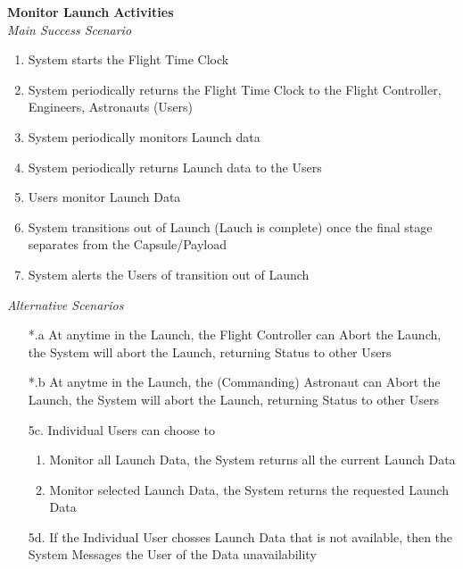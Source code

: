 \documentclass[letterpaper]{article}
\begin{document}
\noindent
\textbf{Monitor Launch Activities}\\
\textit{Main Success Scenario}
\begin{enumerate}
\item System starts the Flight Time Clock
\item System periodically returns the Flight Time Clock to the
Flight Controller, Engineers, Astronauts (Users)
\item System periodically monitors Launch data
\item System periodically returns Launch data to the Users
\item Users monitor Launch Data
\item System transitions out of Launch (Lauch is complete) once the
final stage separates from the Capsule/Payload
\item System alerts the Users of transition out of Launch
\end{enumerate}
\textit{Alternative Scenarios}
\begin{itemize}
\item[*.a]  At anytime in the Launch, the Flight Controller can Abort
the Launch,
the System will abort the Launch, returning Status to other Users
\item[*.b]  At anytme in the Launch, the (Commanding) Astronaut can Abort
the Launch, the System will abort the Launch, returning Status to other
Users
\item[5c.]  Individual Users can choose to
\begin{enumerate}
\item Monitor all Launch Data, the System returns all the current
Launch Data
\item Monitor selected Launch Data, the System returns the requested
Launch Data
\end{enumerate}
\item[5d.] If the Individual User chosses Launch Data that is not
available, then the System Messages the User of the Data unavailability
\end{itemize}
\end{document}
